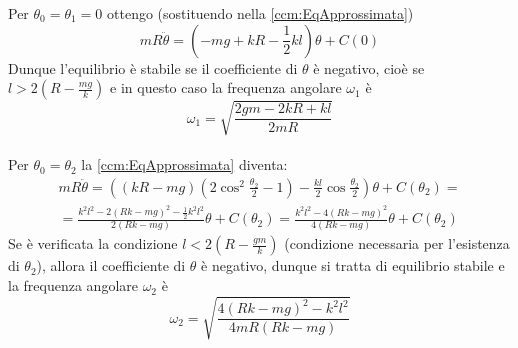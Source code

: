 \documentclass[../main.tex]{subfiles}
\begin{document}
Per $\theta_0 = \theta_1 = 0$ ottengo (sostituendo nella \cref{ccm:EqApprossimata})
\begin{equation*}
	mR\ddot\theta = \left ( -mg + kR -\frac{1}{2}kl\right )\theta + C(0)
\end{equation*}
Dunque l'equilibrio è stabile se il coefficiente di $\theta$ è negativo, cioè se $l> 2\left ( R - \frac{mg}{k} \right )$ e in questo caso la frequenza angolare $\omega_1$ è $$\omega_1 = \sqrt{\frac{2gm-2kR+kl}{2mR}}$$\\

Per $\theta_0=\theta_2$ la \cref{ccm:EqApprossimata} diventa:
\begin{equation*}\begin{split}
	mR\ddot\theta = \left (  \left ( kR-mg\right ) \left ( 2\cos^2\frac{\theta_2}{2}-1\right ) - \frac{kl}{2}\cos\frac{\theta_2}{2}\right ) \theta  + C(\theta_2) =\\
	= \frac {k^2 l^2 - 2\left (Rk-mg\right ) ^2-\frac{1}{2}k^2 l^2}{2\left ( Rk - mg\right )}\theta + C(\theta_2) = \frac{k^2 l^2 - 4 \left ( Rk - mg\right )^2}{4\left (Rk-mg\right )} \theta + C(\theta_2)
\end{split}\end{equation*}
Se è verificata la condizione  $l<2\left ( R - \frac{gm}{k}\right )$ (condizione necessaria per l'esistenza di $\theta_2$), allora il coefficiente di $\theta$ è negativo, dunque si tratta di equilibrio stabile e la frequenza angolare $\omega_2$ è 
$$ \omega_2 = \sqrt {\frac{4\left ( Rk-mg\right )^2-k^2 l^2 }{4mR\left (Rk-mg\right )}} $$

\end{document}
